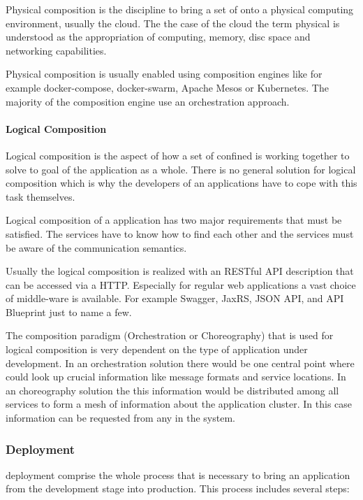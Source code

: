 Physical composition is the discipline to bring a set of \mss{} onto a
physical computing environment, usually the cloud. The the case of the cloud the
term physical is understood as the appropriation of computing, memory, disc
space and networking capabilities.

Physical composition is usually enabled using composition engines like for
example docker-compose, docker-swarm, Apache Mesos or Kubernetes. The majority
of the composition engine use an orchestration approach. 

\paragraph{Logical Composition}

Logical composition is the aspect of how a set of confined \ms{} is working
together to solve to goal of the application as a whole. There is no
general solution for logical composition which is why the developers of an
applications have to cope with this task themselves.

Logical composition of a \ms{} application has two major requirements that must
be satisfied. The services have to know how to find each other and the services
must be aware of the communication semantics. 

Usually the logical composition is realized with an RESTful API description that
can be accessed via a HTTP. Especially for regular web applications a vast
choice of middle-ware is available. For example Swagger, JaxRS, JSON API, and
API Blueprint just to name a few.

The composition paradigm (Orchestration or Choreography) that is used for
logical composition is very dependent on the type of application under
development. In an orchestration solution there would be one central point where
\mss{} could look up crucial information like message formats and service
locations. In an choreography solution the this information would be distributed
among all services to form a mesh of information about the application cluster.
In this case information can be requested from any \ms{} in the system.

\subsubsection{\ms{} Deployment}

\ms{} deployment comprise the whole process that is necessary to bring an application
from the development stage into production. This process includes several steps: 

